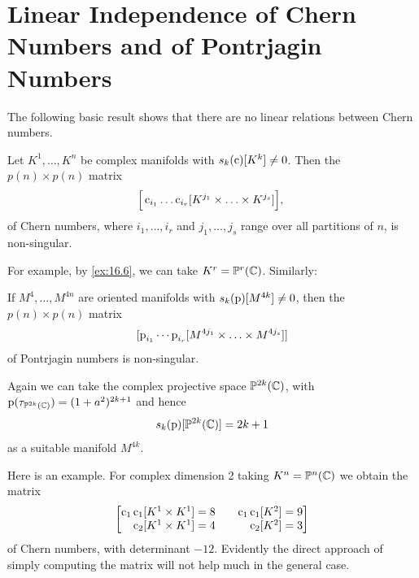 \documentclass[../main]{subfiles}
\begin{document}
\section[Linear Independence of Chern Numbers and of\texorpdfstring{\\}{} Pontrjagin Numbers]{Linear Independence of Chern Numbers and of Pontrjagin Numbers}
The following basic result shows that there are no linear relations between Chern numbers.

\begin{theorem}[Thom]\label{thm:16.07} Let $K^{1}, \ldots, K^{n}$ be complex manifolds with \newline $s_{k}(\operatorname{c})[K^{k}] \neq 0$. Then the $p(n) \times p(n)$ matrix
\[
\Big[\operatorname{c}_{i_{1}} \ldots \operatorname{c}_{i_{r}}[K^{j_{1}} \times \ldots \times K^{j_{s}}]\Big] \text {, }
\]
of Chern numbers, where $i_{1}, \ldots, i_{r}$ and $j_{1}, \ldots, j_{s}$ range over all partitions of $n$, is non-singular.
\end{theorem}
For example, by \ref{ex:16.6}, we can take $K^{r}=\mathbb{P}^{r}(\mathbb{C})$. Similarly:

\begin{theorem}[Thom]\label{thm:16.08} If $M^{4}, \ldots, M^{4 n}$ are oriented manifolds with $s_{k}(\operatorname{p})[M^{4 k}] \neq 0$, then the $p(n) \times p(n)$ matrix
\[
[\operatorname{p}_{i_{1}} \cdots \operatorname{p}_{i_{r}}[M^{4 j_{1}} \times \ldots \times M^{4 j_{s}}]]
\]
of Pontrjagin numbers is non-singular.\end{theorem}

Again we can take the complex projective space $\mathbb{P}^{2 k}{(\mathbb{C})}$, with $\operatorname{p}(\tau_{\mathbb{P}^{2 k}{(\mathbb{C})}})= (1+a^{2})^{2 k+1}$ and hence
\[
s_{k}(\operatorname{p})[\mathbb{P}^{2 k}{(\mathbb{C})}]=2 k+1
\]
as a suitable manifold $M^{4 k}$.

Here is an example. For complex dimension 2 taking $K^{n}=\mathbb{P}^{n}(\mathbb{C})$ we obtain the matrix
\[
\begin{bmatrix}
\hfill\chernclass_{1} \chernclass_{1}[K^{1} \times K^{1}]=8 && \hfill\chernclass_{1} \chernclass_{1}[K^{2}]=9 \\
\hfill\chernclass_{2}[K^{1} \times K^{1}]=4 && \hfill\chernclass_{2}[K^{2}]=3
\end{bmatrix}
\]
of Chern numbers, with determinant $-12$. Evidently the direct approach of simply computing the matrix will not help much in the general case.
\end{document}
